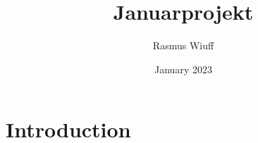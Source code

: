 \documentclass{article}
\title{Januarprojekt}
\author{Rasmus Wiuff}
\date{January 2023}
\begin{document}
\maketitle

\section{Introduction}
\end{document}
